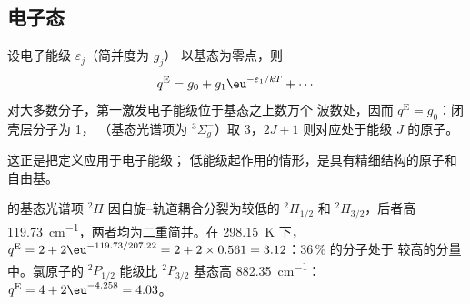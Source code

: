 \subsection*{电子态}

\begin{proposition}[电子配分函数]\label{prop:b3:partition-functions:q-elec}
设电子能级 $\varepsilon_j$（简并度为 $g_j$）
以基态为零点，则
\[
  q^{\mathrm E} = g_0 + g_1\eu^{-\varepsilon_1/kT} + \cdots
\]
对大多数分子，第一激发电子能级位于基态之上数万个
波数处，因而 $q^{\mathrm E} = g_0$：闭壳层分子为 1，
（基态光谱项为 ${}^3\Sigma_g^-$）取 3，$2J + 1$ 则对应处于能级 $J$ 的原子。
\end{proposition}

这正是把定义应用于电子能级；
低能级起作用的情形，是具有精细结构的原子和自由基。

\begin{example}[一氧化氮与氯原子]\label{ex:b3:partition-functions:no-cl}
 的基态光谱项 ${}^2\Pi$ 因自旋–轨道耦合分裂为较低的 ${}^2\Pi_{1/2}$ 和
${}^2\Pi_{3/2}$，后者高 \qty{119.73}{cm^{-1}}，两者均为二重简并。在 \qty{298.15}{K} 下，
$q^{\mathrm E} = 2 + 2\eu^{-119.73/207.22} = 2 + 2\times0.561 = 3.12$：36\,\% 的分子处于
较高的分量中。氯原子的 ${}^2P_{1/2}$ 能级比
${}^2P_{3/2}$ 基态高 \qty{882.35}{cm^{-1}}：$q^{\mathrm E} = 4 + 2\eu^{-4.258} = 4.03$。
\end{example}


